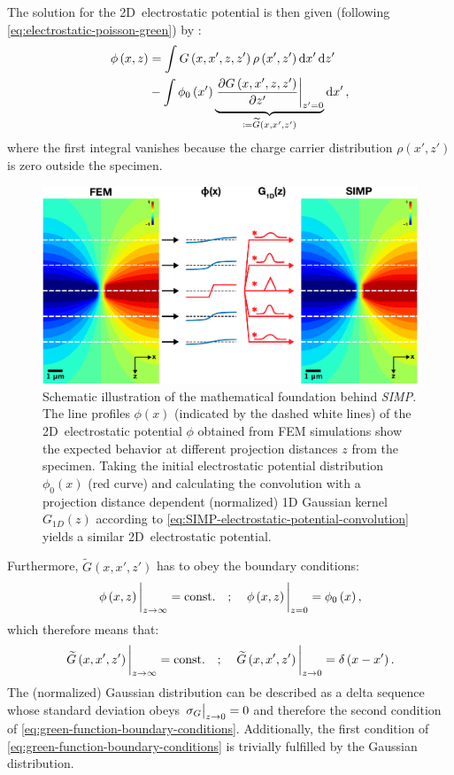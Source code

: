 The solution for the 2D~electrostatic potential is then given (following \cref{eq:electrostatic-poisson-green}) by \cite{Jackson1999}:
\begin{align}
	\label{eq:2D-electrostatic-poisson-green}
  \phi\left(x, z\right) &= \int G\left(x, x', z, z'\right) \rho\left(x', z'\right) \dd{x'} \dd{z'} \nonumber \\
  &- \int \phi_0\left(x'\right) \underbrace{\eval{\pdv{G\left(x, x', z, z'\right)}{z'}}_{z' = 0}}_{\coloneqq \widetilde{G}\left(x, x', z'\right)} \dd{x'},
\end{align}
where the first integral vanishes because the charge carrier distribution $\rho\left(x', z'\right)$ is zero outside the specimen.
\begin{figure}[H]
	\centering
	\includegraphics[width=\textwidth]{Figures/Schematics/SIMP-basic-idea.pdf}
	\caption{Schematic illustration of the mathematical foundation behind \emph{SIMP}. The line profiles $\phi\left(x\right)$ (indicated by the dashed white lines) of the 2D~electrostatic potential $\phi$ obtained from FEM simulations show the expected behavior at different projection distances $z$ from the specimen. Taking the initial electrostatic potential distribution $\phi_0\left(x\right)$ (red curve) and calculating the convolution with a projection distance dependent (normalized) 1D Gaussian kernel $G_{\mathit{1D}}\left(z\right)$ according to \cref{eq:SIMP-electrostatic-potential-convolution} yields a similar 2D~electrostatic potential.}
	\label{fig:SIMP-basic-idea}
\end{figure}
Furthermore, $\widetilde{G}\left(x, x', z'\right)$ has to obey the boundary conditions:
\begin{equation}
	\eval{\phi\left(x, z\right)}_{z \to \infty} = \text{const.} \quad ; \quad \eval{\phi\left(x, z\right)}_{z = 0} = \phi_0 \left(x\right),
\end{equation}
which therefore means that:
\begin{equation}
	\label{eq:green-function-boundary-conditions}
	\eval{\widetilde{G}\left(x, x', z'\right)}_{z \to \infty} = \text{const.} \quad ; \quad \eval{\widetilde{G}\left(x, x', z'\right)}_{z \to 0} = \delta \left(x - x'\right).
\end{equation}
The (normalized) Gaussian distribution can be described as a delta sequence \cite{Jackson1999} whose standard deviation obeys $\eval{\sigma_G}_{z \to 0} = 0$ and therefore the second condition of \cref{eq:green-function-boundary-conditions}. Additionally, the first condition of \cref{eq:green-function-boundary-conditions} is trivially fulfilled by the Gaussian distribution.

